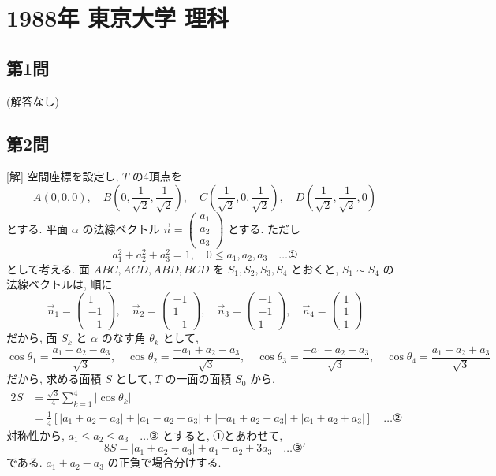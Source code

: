 \documentclass[../main.tex]{subfiles}
\begin{document}
\section*{1988年 東京大学 理科}

\subsection*{第1問}

(解答なし)

\subsection*{第2問}

[解] 空間座標を設定し, $T$ の4頂点を
\[
  A(0,0,0), \quad B\left(0, \frac{1}{\sqrt{2}}, \frac{1}{\sqrt{2}}\right), \quad C\left(\frac{1}{\sqrt{2}}, 0, \frac{1}{\sqrt{2}}\right), \quad D\left(\frac{1}{\sqrt{2}}, \frac{1}{\sqrt{2}}, 0\right)
\]
とする. 平面 $\alpha$ の法線ベクトル $\vec{n} =
\begin{pmatrix} a_1 \\ a_2 \\ a_3
\end{pmatrix}$ とする. ただし
\[
  a_1^2 + a_2^2 + a_3^2 = 1, \quad 0 \le a_1, a_2, a_3 \quad \dots \text{①}
\]
として考える. 面 $ABC, ACD, ABD, BCD$ を $S_1, S_2, S_3, S_4$ とおくと, $S_1 \sim S_4$ の法線ベクトルは, 順に
\[
  \vec{n}_1 =
  \begin{pmatrix} 1 \\ -1 \\ -1
  \end{pmatrix}, \quad \vec{n}_2 =
  \begin{pmatrix} -1 \\ 1 \\ -1
  \end{pmatrix}, \quad \vec{n}_3 =
  \begin{pmatrix} -1 \\ -1 \\ 1
  \end{pmatrix}, \quad \vec{n}_4 =
  \begin{pmatrix} 1 \\ 1 \\ 1
  \end{pmatrix}
\]
だから, 面 $S_k$ と $\alpha$ のなす角 $\theta_k$ として,
\[
  \cos\theta_1 = \frac{a_1-a_2-a_3}{\sqrt{3}}, \quad \cos\theta_2 = \frac{-a_1+a_2-a_3}{\sqrt{3}}, \quad \cos\theta_3 = \frac{-a_1-a_2+a_3}{\sqrt{3}}, \quad \cos\theta_4 = \frac{a_1+a_2+a_3}{\sqrt{3}}
\]
だから, 求める面積 $S$ として, $T$ の一面の面積 $S_0$ から,
\begin{align*}
  2S &= \frac{\sqrt{3}}{4} \sum_{k=1}^4 |\cos\theta_k| \\
  &= \frac{1}{4} \left[ |a_1+a_2-a_3| + |a_1-a_2+a_3| + |-a_1+a_2+a_3| + |a_1+a_2+a_3| \right] \quad \dots \text{②}
\end{align*}
対称性から, $a_1 \le a_2 \le a_3 \quad \dots \text{③}$ とすると, ①とあわせて,
\[
  8S = |a_1+a_2-a_3| + a_1+a_2+3a_3 \quad \dots \text{③}'
\]
である. $a_1+a_2-a_3$ の正負で場合分けする.
\end{document}
